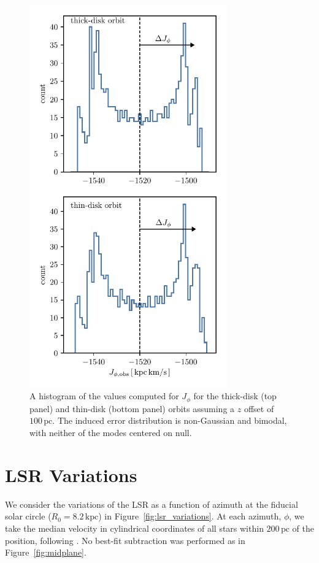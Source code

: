 \documentclass[twocolumn]{aastex62}
\newcommand{\pc}{\text{pc}}
\newcommand{\kpc}{\text{kpc}}
\begin{document}
\begin{figure}
\begin{center}
\includegraphics[width=3.35224200913in]{fig/schmactions_Jphi_xerr_hist.pdf}
\end{center}
\caption{A histogram of the values computed for $J_{\phi}$ for the thick-disk
(top panel) and thin-disk (bottom panel) orbits assuming a $z$ offset of
$100\,\pc$. The induced error distribution is non-Gaussian and bimodal, with
neither of the modes centered on null.}
\label{fig:Jphi_xerr_hist}
\end{figure}

\section{LSR Variations} \label{app:lsr}
We consider the variations of the LSR as a function of azimuth at the fiducial
solar circle ($R_{0} = 8.2\,\kpc$) in Figure~\ref{fig:lsr_variations}. At
each azimuth, $\phi$, we take the median velocity in cylindrical coordinates
of all stars within $200\,\pc$ of the position, following
\citet{2018arXiv180610564S}. No best-fit subtraction was performed as in
Figure~\ref{fig:midplane}.
\end{document}
